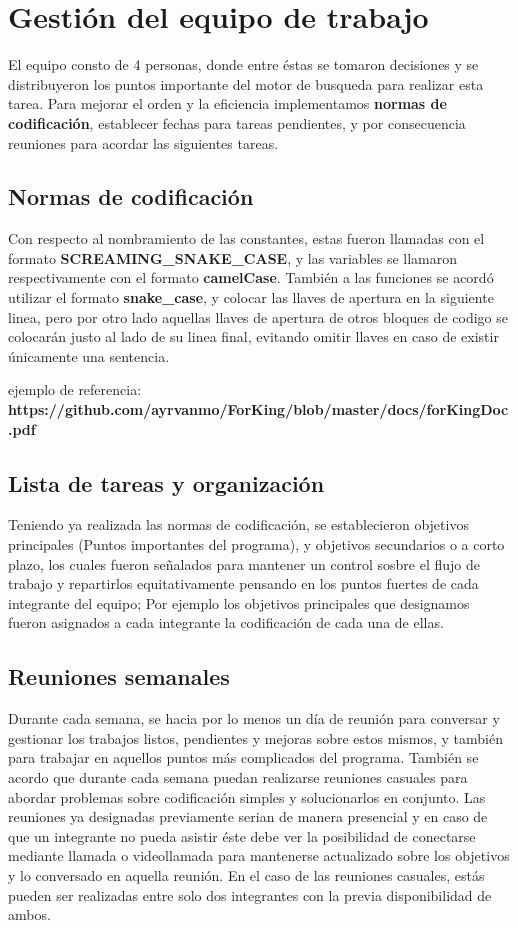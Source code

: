 \section{Gestión del equipo de trabajo}
\rhostart{}

El equipo consto de 4 personas, donde entre éstas se tomaron decisiones y se distribuyeron los puntos importante del motor de busqueda para realizar esta tarea. Para mejorar el orden y la eficiencia implementamos \textbf{normas de codificación}, establecer fechas para tareas pendientes, y por consecuencia reuniones para acordar las siguientes tareas.

\subsection{Normas de codificación}
Con respecto al nombramiento de las constantes, estas fueron llamadas con el formato \textbf{SCREAMING\_SNAKE\_CASE}, y las variables se llamaron respectivamente con el formato \textbf{camelCase}. También a las funciones se acordó utilizar el formato \textbf{snake\_case}, y colocar las llaves de apertura en la siguiente linea, pero por otro lado aquellas llaves de apertura de otros bloques de codigo se colocarán justo al lado de su linea final, evitando omitir llaves en caso de existir únicamente una sentencia.

ejemplo de referencia: \textbf{https://github.com/ayrvanmo/ForKing/blob/master/docs/forKingDoc.pdf}

\subsection{Lista de tareas y organización}
Teniendo ya realizada las normas de codificación, se establecieron objetivos principales (Puntos importantes del programa), y objetivos secundarios o a corto plazo, los cuales fueron señalados para mantener un control sosbre el flujo de trabajo y repartirlos equitativamente pensando en los puntos fuertes de cada integrante del equipo; Por ejemplo los objetivos principales que designamos fueron asignados a cada integrante la codificación de cada una de ellas.

\subsection{Reuniones semanales}
Durante cada semana, se hacia por lo menos un día de reunión para conversar y gestionar los trabajos listos, pendientes y mejoras sobre estos mismos, y también para trabajar en aquellos puntos más complicados del programa. También se acordo que durante cada semana puedan realizarse reuniones casuales para abordar problemas sobre codificación simples y solucionarlos en conjunto. Las reuniones ya designadas previamente serian de manera presencial y en caso de que un integrante no pueda asistir éste debe ver la posibilidad de conectarse mediante llamada o videollamada para mantenerse actualizado sobre los objetivos y lo conversado en aquella reunión. En el caso de las reuniones casuales, estás pueden ser realizadas entre solo dos integrantes con la previa disponibilidad de ambos.